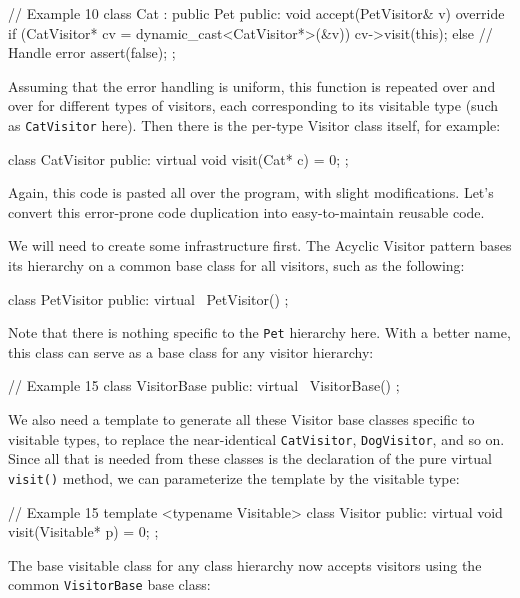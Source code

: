 \begin{code}
// Example 10
class Cat : public Pet {
  public:
  void accept(PetVisitor& v) override {
    if (CatVisitor* cv = dynamic_cast<CatVisitor*>(&v)) {
      cv->visit(this);
    } else { // Handle error
      assert(false);
    }
  }
};
\end{code}

Assuming that the error handling is uniform, this function is repeated over and over for different types of visitors, each corresponding to its visitable type (such as \texttt{CatVisitor} here). Then there is the per-type Visitor class itself, for example:

\begin{code}
class CatVisitor {
  public:
  virtual void visit(Cat* c) = 0;
};
\end{code}

Again, this code is pasted all over the program, with slight modifications. Let's convert this error-prone code duplication into easy-to-maintain reusable code.

We will need to create some infrastructure first. The Acyclic Visitor pattern bases its hierarchy on a common base class for all visitors, such as the following:

\begin{code}
class PetVisitor {
  public:
  virtual ~PetVisitor() {}
};
\end{code}

Note that there is nothing specific to the \texttt{Pet} hierarchy here. With a better name, this class can serve as a base class for any visitor hierarchy:

\begin{code}
// Example 15
class VisitorBase {
  public:
  virtual ~VisitorBase() {}
};
\end{code}

We also need a template to generate all these Visitor base classes specific to visitable types, to replace the near-identical \texttt{CatVisitor}, \texttt{DogVisitor}, and so on. Since all that is needed from these classes is the declaration of the pure virtual \texttt{visit()} method, we can parameterize the template by the visitable type:

\begin{code}
// Example 15
template <typename Visitable> class Visitor {
  public:
  virtual void visit(Visitable* p) = 0;
};
\end{code}

The base visitable class for any class hierarchy now accepts visitors using the common \texttt{VisitorBase} base class:

